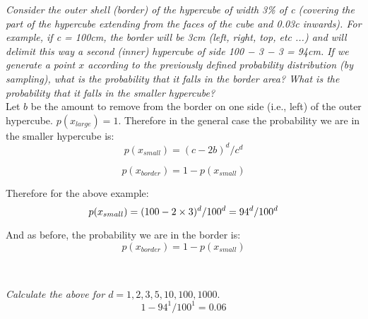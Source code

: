 \documentclass{amsart}
\theoremstyle{definition}
\theoremstyle{remark}
\numberwithin{equation}{section}
\begin{document}
\textit{Consider the outer shell (border) of the hypercube of width 
3\% of c (covering the part of the hypercube extending from the faces of 
the cube and 0.03c inwards). For example, if c = 100cm, the border will
be 3cm (left, right, top, etc ...) and will delimit this way a second
(inner) hypercube of side 100 − 3 − 3 = 94cm. If we generate a point $x$
according to the previously defined probability distribution (by 
sampling), what is the probability that it falls in the border area? What
is the probability that it falls in the smaller hypercube?} \\

Let $b$ be the amount to remove from the border on one side (i.e., left) 
of the outer hypercube. $p(x_{large}) = 1$. Therefore in the general case the 
probability we are in the smaller hypercube is:\\

\begin{equation}
    p(x_{small}) = (c-2b)^d / c^d
\end{equation}

\begin{equation}
    p(x_{border}) = 1 - p(x_{small})
\end{equation}

Therefore for the above example: \\

\begin{equation}
    p(x_{small}) = (100 - 2 \times 3)^d / 100^d = 94^d / 100^d \\
\end{equation}

And as before, the probability we are in the border is: \\

\begin{equation}
    p(x_{border}) = 1 - p(x_{small})
\end{equation} \\

\subsection{} 

\textit{Calculate the above for $d = {1, 2, 3, 5, 10, 100, 1000}$}. \\

\begin{equation}
    1- 94^1 / 100^1 = 0.06
\end{equation}
\end{document}
